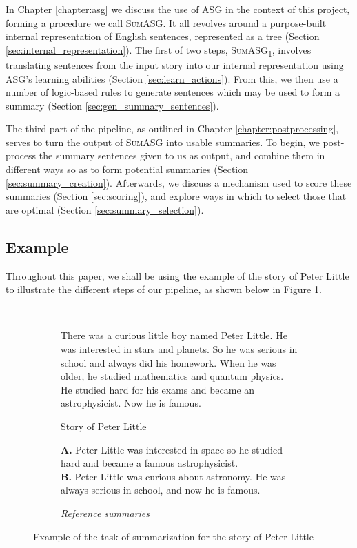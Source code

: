 In Chapter \ref{chapter:asg} we discuss the use of ASG in the context of this project, forming a procedure we call \textsc{SumASG}. It all revolves around a purpose-built internal representation of English sentences, represented as a tree (Section \ref{sec:internal_representation}). The first of two steps, \textsc{SumASG\textsubscript{1}}, involves translating sentences from the input story into our internal representation using ASG's learning abilities (Section \ref{sec:learn_actions}). From this, we then use a number of logic-based rules to generate sentences which may be used to form a summary (Section \ref{sec:gen_summary_sentences}).

The third part of the pipeline, as outlined in Chapter \ref{chapter:postprocessing}, serves to turn the output of \textsc{SumASG} into usable summaries. To begin, we post-process the summary sentences given to us as output, and combine them in different ways so as to form potential summaries (Section \ref{sec:summary_creation}). Afterwards, we discuss a mechanism used to score these summaries (Section \ref{sec:scoring}), and explore ways in which to select those that are optimal (Section \ref{sec:summary_selection}).

\subsection{Example}

Throughout this paper, we shall be using the example of the story of Peter Little to illustrate the different steps of our pipeline, as shown below in Figure \ref{fig:peter_little}.

\begin{figure}[H]\
\begin{subfigure}{\textwidth}
\begin{displayquote}
There was a curious little boy named Peter Little. He was interested in stars and planets. So he was serious in school and always did his homework. When he was older, he studied mathematics and quantum physics. He studied hard for his exams and became an astrophysicist. Now he is famous.
\end{displayquote}
\caption{Story of Peter Little}
\vspace{\baselineskip}
\end{subfigure}
\begin{subfigure}{\textwidth}
\begin{displayquote}
\textbf{A.} Peter Little was interested in space so he studied hard and became a famous astrophysicist.\\
\textbf{B.} Peter Little was curious about astronomy. He was always serious in school, and now he is famous.
\caption{\textit{Reference summaries}}
\end{displayquote}
\end{subfigure}
\caption{Example of the task of summarization for the story of Peter Little}
\label{fig:peter_little}
\end{figure}

